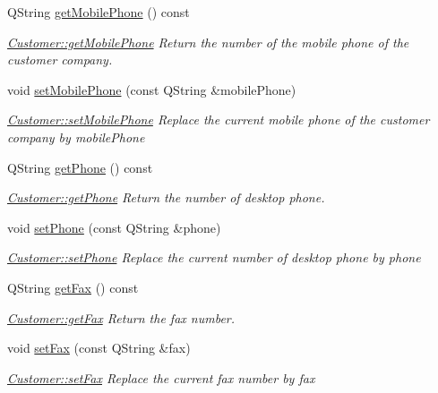 \begin{DoxyCompactItemize}
Q\-String \hyperlink{classModels_1_1Customer_a97211324b1f890b5f7a3fffc447289d7}{get\-Mobile\-Phone} () const 
\begin{DoxyCompactList}\small\item\em \hyperlink{classModels_1_1Customer_a97211324b1f890b5f7a3fffc447289d7}{Customer\-::get\-Mobile\-Phone} Return the number of the mobile phone of the customer company. \end{DoxyCompactList}\item 
void \hyperlink{classModels_1_1Customer_abefe9de1e3c46501916e461ba6609450}{set\-Mobile\-Phone} (const Q\-String \&mobile\-Phone)
\begin{DoxyCompactList}\small\item\em \hyperlink{classModels_1_1Customer_abefe9de1e3c46501916e461ba6609450}{Customer\-::set\-Mobile\-Phone} Replace the current mobile phone of the customer company by {\itshape mobile\-Phone} \end{DoxyCompactList}\item 
Q\-String \hyperlink{classModels_1_1Customer_a0438cd11dfe13bb89c0233ffe288cc73}{get\-Phone} () const 
\begin{DoxyCompactList}\small\item\em \hyperlink{classModels_1_1Customer_a0438cd11dfe13bb89c0233ffe288cc73}{Customer\-::get\-Phone} Return the number of desktop phone. \end{DoxyCompactList}\item 
void \hyperlink{classModels_1_1Customer_abbc25028b09ae36da632cefbfbbbcce6}{set\-Phone} (const Q\-String \&phone)
\begin{DoxyCompactList}\small\item\em \hyperlink{classModels_1_1Customer_abbc25028b09ae36da632cefbfbbbcce6}{Customer\-::set\-Phone} Replace the current number of desktop phone by {\itshape phone} \end{DoxyCompactList}\item 
Q\-String \hyperlink{classModels_1_1Customer_a08ce4fbbd62f3e3f407faea2bf351f69}{get\-Fax} () const 
\begin{DoxyCompactList}\small\item\em \hyperlink{classModels_1_1Customer_a08ce4fbbd62f3e3f407faea2bf351f69}{Customer\-::get\-Fax} Return the fax number. \end{DoxyCompactList}\item 
void \hyperlink{classModels_1_1Customer_a4a6ba86c58db9bca2737bbeb723a0db3}{set\-Fax} (const Q\-String \&fax)
\begin{DoxyCompactList}\small\item\em \hyperlink{classModels_1_1Customer_a4a6ba86c58db9bca2737bbeb723a0db3}{Customer\-::set\-Fax} Replace the current fax number by {\itshape fax} \end{DoxyCompactList}\item 

\end{DoxyCompactItemize}
